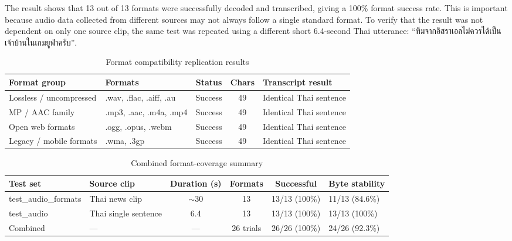 \documentclass[12pt,oneside,openright,a4paper]{cpe-english-project}
\begin{document}
The result shows that 13 out of 13 formats were successfully decoded and transcribed, giving a 100\% format success rate. This is important because audio data collected from different sources may not always follow a single standard format. To verify that the result was not dependent on only one source clip, the same test was repeated using a different short 6.4-second Thai utterance: \textthai{``ทีมจากอิสราเอลไม่ควรได้เป็นเจ้าบ้านในเกมยูฟ่าครับ''}.

\begin{table}[H]
\centering
\caption{Format compatibility replication results}\label{tbl:audio-format-rep}
\small
\begin{tabular}{|p{}|p{}|c|c|p{}|}
\hline
\textbf{Format group} & \textbf{Formats} & \textbf{Status} & \textbf{Chars} & \textbf{Transcript result} \\ \hline
Lossless / uncompressed & .wav, .flac, .aiff, .au & Success & 49 & Identical Thai sentence \\ \hline
MP / AAC family & .mp3, .aac, .m4a, .mp4 & Success & 49 & Identical Thai sentence \\ \hline
Open web formats & .ogg, .opus, .webm & Success & 49 & Identical Thai sentence \\ \hline
Legacy / mobile formats & .wma, .3gp & Success & 49 & Identical Thai sentence \\ \hline
\end{tabular}
\end{table}

\begin{table}[H]
\centering
\caption{Combined format-coverage summary}\label{tbl:audio-format-combined}
\small
\begin{tabular}{|p{}|p{}|c|c|c|p{}|}
\hline
\textbf{Test set} & \textbf{Source clip} & \textbf{Duration (s)} & \textbf{Formats} & \textbf{Successful} & \textbf{Byte stability} \\ \hline
test\_audio\_formats & Thai news clip & $\sim$30 & 13 & 13/13 (100\%) & 11/13 (84.6\%) \\ \hline
test\_audio & Thai single sentence & 6.4 & 13 & 13/13 (100\%) & 13/13 (100\%) \\ \hline
Combined & --- & --- & 26 trials & 26/26 (100\%) & 24/26 (92.3\%) \\ \hline
\end{tabular}
\end{table}
\end{document}
